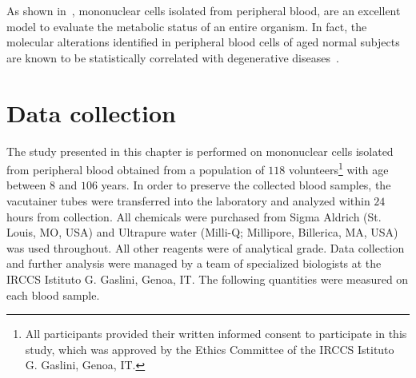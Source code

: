 As shown in~\cite{mckerrell2015leukemia}, mononuclear cells isolated from peripheral blood, are an excellent model to evaluate the metabolic status of an entire organism. In fact, the molecular alterations identified in peripheral blood cells of aged normal subjects are known to be statistically correlated with degenerative diseases~\cite{jaiswal2014age}.


\section{Data collection} \label{sec:frassoni_data_collection}

The study presented in this chapter is performed on mononuclear cells isolated from peripheral blood obtained from a population of $118$ volunteers\footnote{ All participants provided their written informed consent to participate in this study, which was approved by the Ethics Committee of the IRCCS Istituto G. Gaslini, Genoa, IT.} with age between $8$ and $106$ years.
In order to preserve the collected blood samples, the vacutainer tubes were transferred into the laboratory and analyzed within $24$ hours from collection.
All chemicals were purchased from Sigma Aldrich (St. Louis, MO, USA) and Ultrapure water (Milli-Q; Millipore, Billerica, MA, USA) was used throughout. All other reagents were of analytical grade.
Data collection and further analysis were managed by a team of specialized biologists at the IRCCS Istituto G. Gaslini, Genoa, IT. The following quantities were measured on each blood sample.

